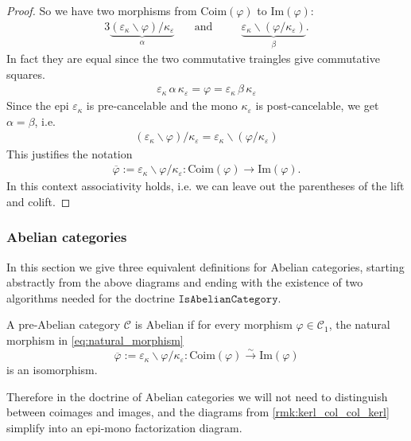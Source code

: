 \begin{proof}
So we have two morphisms from $\mathrm{Coim}(\varphi)$ to $\mathrm{Im}(\varphi)$:
\begin{alignat*}{3}
\underbrace{(\varepsilon_{\kappa}\backslash \varphi) / \kappa_{\varepsilon}}_{\alpha} & \quad\text{and}\quad
&& \underbrace{\varepsilon_{\kappa}\backslash(\varphi/\kappa_{\varepsilon})}_{\beta}.
\end{alignat*}
In fact they are equal since the two commutative traingles give commutative squares.
\begin{align*}
\varepsilon_{\kappa}\, \alpha \, \kappa_{\varepsilon} = \varphi = \varepsilon_{\kappa}\, \beta \, \kappa_{\varepsilon} 
\end{align*}
Since the epi $\varepsilon_{\kappa}$ is pre-cancelable and the mono $\kappa_{\varepsilon}$ is post-cancelable, we get $\alpha = \beta$, i.e.
\begin{align*}
(\varepsilon_{\kappa}\backslash \varphi) / \kappa_{\varepsilon} = \varepsilon_{\kappa}\backslash(\varphi/\kappa_{\varepsilon})
\end{align*}
This justifies the notation
\begin{align}\label{eq:natural_morphism}
\overline{\varphi} := \varepsilon_{\kappa}\backslash \varphi / \kappa_{\varepsilon} : \mathrm{Coim}(\varphi) \rightarrow \mathrm{Im}(\varphi).
\end{align}
In this context associativity holds, i.e. we can leave out the parentheses of the lift and colift.
\end{proof}






\newpage
\subsubsection{Abelian categories}

In this section we give three equivalent definitions for Abelian categories, starting abstractly from the above diagrams
and ending with the existence of two algorithms needed for the doctrine $\mathtt{IsAbelianCategory}$.

\begin{definition}
A pre-Abelian category $\mathcal{C}$ is Abelian if for every morphism $\varphi \in \mathcal{C}_{1}$, the natural morphism
in \eqref{eq:natural_morphism}
\[
\overline{\varphi} := \varepsilon_{\kappa}\backslash \varphi/\kappa_{\varepsilon} : \mathrm{Coim}(\varphi)
\xrightarrow{\sim} \mathrm{Im}(\varphi)
\]
is an isomorphism.
\end{definition}
Therefore in the doctrine of Abelian categories we will not need to distinguish between coimages and images, and
the diagrams from \ref{rmk:kerl_col_col_kerl} simplify into an epi-mono factorization diagram.

